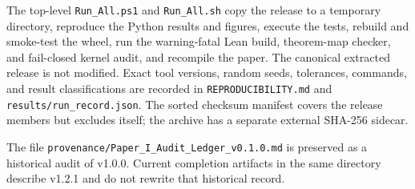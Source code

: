 \documentclass[11pt]{article}
\theoremstyle{definition}
\theoremstyle{remark}
\begin{document}
The top-level \texttt{Run\_All.ps1} and \texttt{Run\_All.sh} copy the release to a temporary directory, reproduce the Python results and figures, execute the tests, rebuild and smoke-test the wheel, run the warning-fatal Lean build, theorem-map checker, and fail-closed kernel audit, and recompile the paper. The canonical extracted release is not modified. Exact tool versions, random seeds, tolerances, commands, and result classifications are recorded in \texttt{REPRODUCIBILITY.md} and \texttt{results/run\_record.json}. The sorted checksum manifest covers the release members but excludes itself; the archive has a separate external SHA-256 sidecar.

The file \texttt{provenance/Paper\_I\_Audit\_Ledger\_v0.1.0.md} is preserved as a historical audit of v1.0.0. Current completion artifacts in the same directory describe v1.2.1 and do not rewrite that historical record.
\end{document}
